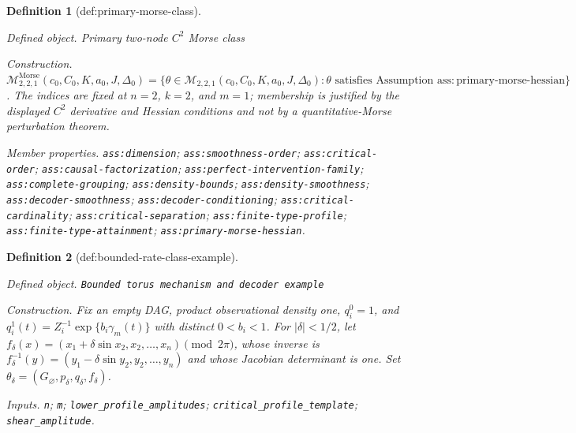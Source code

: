 \documentclass{article}
\newtheorem{definition}{Definition}
\begin{document}
\begin{definition}[def:primary-morse-class]\label{def:primary-morse-class}
\par\smallskip\noindent\emph{Defined object.} Primary two-node \(C^2\) Morse class
\par\smallskip\noindent\emph{Construction.} \(\mathcal M^{\mathrm{Morse}}_{2,2,1}(c_0,C_0,K,a_0,J,\Delta_0)=\{\theta\in\mathcal M_{2,2,1}(c_0,C_0,K,a_0,J,\Delta_0):\theta\text{ satisfies Assumption }\mathrm{ass:primary\text{-}morse\text{-}hessian}\}\). The indices are fixed at \(n=2\), \(k=2\), and \(m=1\); membership is justified by the displayed \(C^2\) derivative and Hessian conditions and not by a quantitative-Morse perturbation theorem.
\par\smallskip\noindent\emph{Member properties.} \texttt{ass:\allowbreak{}dimension}; \texttt{ass:\allowbreak{}smoothness-\allowbreak{}order}; \texttt{ass:\allowbreak{}critical-\allowbreak{}order}; \texttt{ass:\allowbreak{}causal-\allowbreak{}factorization}; \texttt{ass:\allowbreak{}perfect-\allowbreak{}intervention-\allowbreak{}family}; \texttt{ass:\allowbreak{}complete-\allowbreak{}grouping}; \texttt{ass:\allowbreak{}density-\allowbreak{}bounds}; \texttt{ass:\allowbreak{}density-\allowbreak{}smoothness}; \texttt{ass:\allowbreak{}decoder-\allowbreak{}smoothness}; \texttt{ass:\allowbreak{}decoder-\allowbreak{}conditioning}; \texttt{ass:\allowbreak{}critical-\allowbreak{}cardinality}; \texttt{ass:\allowbreak{}critical-\allowbreak{}separation}; \texttt{ass:\allowbreak{}finite-\allowbreak{}type-\allowbreak{}profile}; \texttt{ass:\allowbreak{}finite-\allowbreak{}type-\allowbreak{}attainment}; \texttt{ass:\allowbreak{}primary-\allowbreak{}morse-\allowbreak{}hessian}.
\end{definition}

\begin{definition}[def:bounded-rate-class-example]\label{def:bounded-rate-class-example}
\par\smallskip\noindent\emph{Defined object.} \texttt{Bounded torus mechanism and decoder example}
\par\smallskip\noindent\emph{Construction.} Fix an empty DAG, product observational density one, \(q_i^0=1\), and \(q_i^1(t)=Z_i^{-1}\exp\{b_i\gamma_m(t)\}\) with distinct \(0<b_i<1\). For \(|\delta|<1/2\), let \(f_\delta(x)=(x_1+\delta\sin x_2,x_2,\ldots,x_n)\pmod{2\pi}\), whose inverse is \(f_\delta^{-1}(y)=(y_1-\delta\sin y_2,y_2,\ldots,y_n)\) and whose Jacobian determinant is one. Set \(\theta_\delta=(G_\varnothing,p_\delta,q_\delta,f_\delta)\).
\par\smallskip\noindent\emph{Inputs.} \texttt{n}; \texttt{m}; \texttt{lower\_\allowbreak{}profile\_\allowbreak{}amplitudes}; \texttt{critical\_\allowbreak{}profile\_\allowbreak{}template}; \texttt{shear\_\allowbreak{}amplitude}.
\end{definition}
\end{document}
